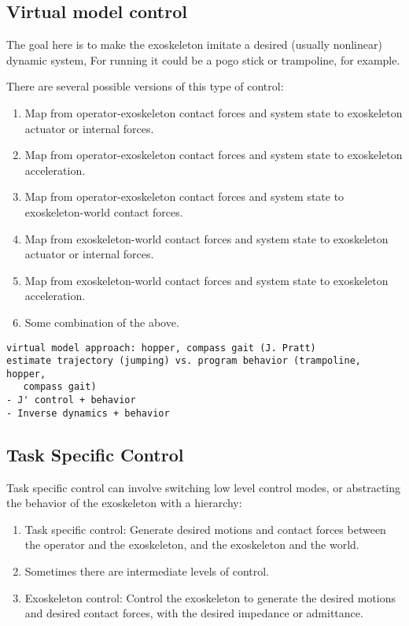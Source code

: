 \documentclass[letterpaper,12pt,fullpage]{article}
\begin{document}
\subsection{Virtual model control}

The goal here is to make the exoskeleton imitate a desired (usually nonlinear)
dynamic system,
For running it could be a pogo stick or trampoline, for example.

There are several possible versions of this type of control:
\begin{enumerate}
\item
Map from operator-exoskeleton contact forces and system state
to exoskeleton actuator or internal forces.
\item
Map from operator-exoskeleton contact forces and system state
to exoskeleton acceleration.
\item
Map from operator-exoskeleton contact forces and system state
to exoskeleton-world contact forces.
\item
Map from exoskeleton-world contact forces and system state to exoskeleton actuator or internal forces.
\item
Map from exoskeleton-world contact forces and system state to exoskeleton acceleration.
\item
Some combination of the above.
\end{enumerate}

\begin{verbatim}
virtual model approach: hopper, compass gait (J. Pratt)
estimate trajectory (jumping) vs. program behavior (trampoline, hopper,
   compass gait)
- J' control + behavior
- Inverse dynamics + behavior
\end{verbatim}

\subsection{Task Specific Control}

Task specific control can involve switching low level control modes, or abstracting
the behavior of the exoskeleton with a hierarchy:
\begin{enumerate}
\item
Task specific control: Generate desired motions and contact forces between
the operator and the exoskeleton, and the exoskeleton and the world.
\item
Sometimes there are intermediate levels of control.
\item
Exoskeleton control: Control the exoskeleton to generate the desired motions and
desired contact forces, with the desired impedance or admittance.
\end{enumerate}
\end{document}
